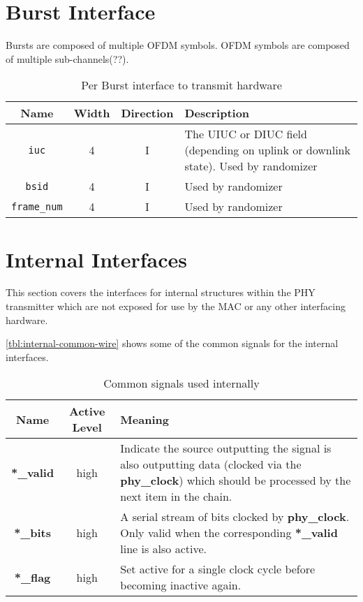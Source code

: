 \documentclass[dvips,10pt,twocolumn]{article}
\begin{document}
\section{Burst Interface}
\label{sec:burst}

Bursts are composed of multiple OFDM symbols. OFDM symbols are composed of
multiple sub-channels(??).

\begin{table*}
	\begin{tabularx}{\textwidth}{c|c|c|X}
		\label{tbl:burst-io}
		Name & Width & Direction & Description\\ \hline

		\texttt{iuc} & 4 & I & The UIUC or DIUC field (depending on uplink
		or downlink state). Used by randomizer\\
		
		\texttt{bsid} & 4 & I & Used by randomizer \\
		
		\texttt{frame\_num} & 4 & I & Used by randomizer \\

	\end{tabularx}
	\caption{Per Burst interface to transmit hardware}
\end{table*}

	
\section{Internal Interfaces}
This section covers the interfaces for internal structures within the PHY
transmitter which are not exposed for use by the MAC or any other interfacing
hardware.

\autoref{tbl:internal-common-wire} shows some of the common signals for
the internal interfaces.

\begin{table*}
\begin{tabulary}{\textwidth}{c|C|L}
	\label{tbl:internal-common-wire}
	Name & Active Level & Meaning \\ \hline
	
	\textbf{*\_valid} & high & Indicate the source outputting the signal
	is also outputting data (clocked via the \textbf{phy\_clock}) which
	should be processed by the next item in the chain. \\

	\textbf{*\_bits} & high & A serial stream of bits clocked by
	\textbf{phy\_clock}. Only valid when the corresponding
	\textbf{*\_valid} line is also active. \\

	\textbf{*\_flag} & high & Set active for a single clock cycle
	before becoming inactive again.
\end{tabulary}
\caption{Common signals used internally}
\end{table*}
\end{document}
